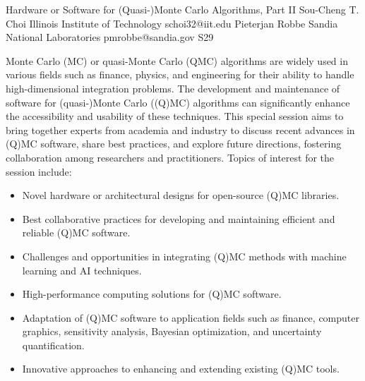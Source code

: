 \documentclass[12pt,lettersize,oneside]{book} %
\begin{document}
\begin{session}
 {Hardware or Software for (Quasi-)Monte Carlo Algorithms, Part II}%
 {Sou-Cheng T. Choi}%
 {Illinois Institute of Technology}%
 {schoi32@iit.edu}%
 {Pieterjan Robbe}%
 {Sandia National Laboratories}%
 {pmrobbe@sandia.gov}%
 {S29}%
 {}%

 Monte Carlo (MC) or quasi-Monte Carlo (QMC) algorithms are widely used in various fields such as finance, physics, and engineering for their ability to handle high-dimensional integration problems. The development and maintenance of software for (quasi-)Monte Carlo ((Q)MC) algorithms can significantly enhance the accessibility and usability of these techniques. This special session aims to bring together experts from academia and industry to discuss recent advances in (Q)MC software, share best practices, and explore future directions, fostering collaboration among researchers and practitioners.
 Topics of interest for the session include:
 \begin{itemize}
 \item Novel hardware or architectural designs for open-source (Q)MC libraries.
 \item Best collaborative practices for developing and maintaining efficient and reliable (Q)MC software.
 \item Challenges and opportunities in integrating (Q)MC methods with machine learning and AI techniques.
 \item High-performance computing solutions for (Q)MC software.
 \item Adaptation of (Q)MC software to application fields such as finance, computer graphics, sensitivity analysis, Bayesian optimization, and uncertainty quantification.
 \item Innovative approaches to enhancing and extending existing (Q)MC tools.
 \end{itemize}
\end{session}


\end{document}
